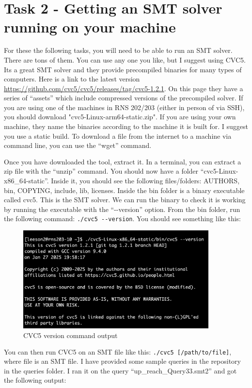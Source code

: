 \documentclass{article}
\begin{document}
\section*{Task 2 - Getting an SMT solver running on your machine}
For these the following tasks, you will need to be able to run an SMT solver.
There are tons of them.
You can use any one you like, but I suggest using CVC5.
Its a great SMT solver and they provide precompiled binaries for many types of computers.
Here is a link to the latest version \url{https://github.com/cvc5/cvc5/releases/tag/cvc5-1.2.1}.
On this page they have a series of ``assets'' which include compressed versions of the precompiled solver.
If you are using one of the machines in RNS 202/203 (either in person of via SSH), you should download "cvc5-Linux-arm64-static.zip".
If you are using your own machine, they name the binaries according to the machine it is built for. I suggest you use a static build.
To download a file from the internet to a machine via command line, you can use the ``wget'' command.

Once you have downloaded the tool, extract it. In a terminal, you can extract a zip file with the ``unzip'' command. You should now have a folder ``cvc5-Linux-x86\_64-static''.
Inside it, you should see the following files/folders: AUTHORS, bin, COPYING, include, lib, licenses.
Inside the bin folder is a binary executable called cvc5.
This is the SMT solver.
We can run the binary to check it is working by running the executable with the ``-{}-version'' option.
From the bin folder, run the following command: \texttt{./cvc5 -{}-version}. You should see something like this:
\newpage
\begin{figure}[!t]
    \centering
    \includegraphics[width=0.9\textwidth ]{imgs/CVC-version.png}
    \caption{CVC5 version command output}\label{fig:CVC5-version}
\end{figure}

You can then run CVC5 on an SMT file like this: \texttt{./cvc5 [/path/to/file]}, where file is an SMT file. I have provided some sample queries in the repository in the queries folder. I ran it on the query ``up\_reach\_Query33.smt2'' and got the following output:
\end{document}
